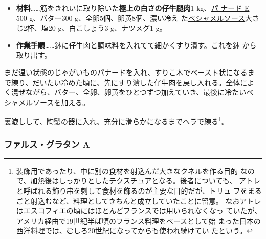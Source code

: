 \begin{recette}
\begin{itemize}
\item
  \textbf{材料}\ldots{}\ldots{}筋をきれいに取り除いた\textbf{極上の白さの仔牛腿肉}1
  kg、\protect\hyperlink{panade-e}{パ ナード E} 500 g、バター300
  g、全卵5個、卵黄8個、濃い冷え
  た\protect\hyperlink{sauce-bechamel}{ベシャメルソース}大さじ2杯、塩20
  g、白こしょう3 g、ナツメグ1 g。
\item
  \textbf{作業手順}\ldots{}\ldots{}鉢に仔牛肉と調味料を入れてて細かくすり潰す。これを鉢
  から取り出す。
\end{itemize}

まだ温い状態のじゃがいものパナードを入れ、すりこ木でペースト状になるま
で練り、だいたい冷めた頃に、先にすり潰した仔牛肉を戻し入れる。全体によ
く混ぜながら、バター、全卵、卵黄をひとつずつ加えていき、最後に冷たいベ
シャメルソースを加える。

裏漉しして、陶製の器に入れ、充分に滑らかになるまでヘラで練る\footnote{装飾用であったり、中に別の食材を射込んだ大きなクネルを作る目的
  なので、加熱後はしっかりとしたテクスチュアとなる。後者についても、
  アトレと呼ばれる飾り串を刺して食材を飾るのが主要な目的だが、トリュ
  フをまるごと射込むなど、料理としてきちんと成立していたことに留意。
  なおアトレはエスコフィエの頃にはほとんどフランスでは用いられなくなっ
  ていたが、アメリカ経由で19世紀半ば頃のフランス料理をベースとして始
  まった日本の西洋料理では、むしろ20世紀になってからも使われ続けてい
  たという。}。

\maeaki


\hypertarget{farce-gratin-a}{%
\subsubsection{ファルス・グラタン A}\label{farce-gratin-a}}


\end{recette}
